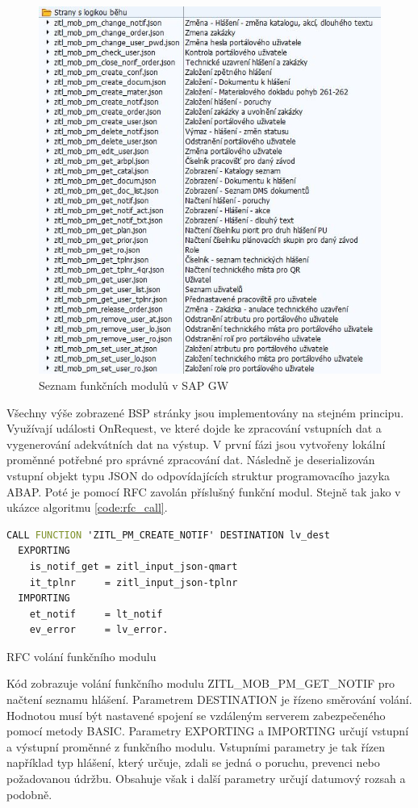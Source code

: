 \documentclass[thesis=M,czech]{FITthesis}[2012/06/26]
\begin{document}
\begin{figure}[H]
	\centering
	\includegraphics[width=1\textwidth]{images/gw_json}
	\caption{Seznam funkčních modulů v SAP GW}
	\label{img:gw_json}
\end{figure}

Všechny výše zobrazené BSP stránky jsou implementovány na stejném principu. Využívají události OnRequest, ve které dojde ke zpracování vstupních dat a vygenerování adekvátních dat na výstup. V první fázi jsou vytvořeny lokální proměnné potřebné pro správné zpracování dat. Následně je deserializován vstupní objekt typu JSON do odpovídajících struktur programovacího jazyka ABAP. Poté je pomocí RFC zavolán příslušný funkční modul. Stejně tak jako v ukázce algoritmu \ref{code:rfc_call}. 

\begin{algorithm}[H]	
	\begin{lstlisting}[language = VHDL]  
CALL FUNCTION 'ZITL_PM_CREATE_NOTIF' DESTINATION lv_dest
  EXPORTING
    is_notif_get = zitl_input_json-qmart
    it_tplnr     = zitl_input_json-tplnr
  IMPORTING
    et_notif     = lt_notif
    ev_error     = lv_error.
	\end{lstlisting}
	\caption{RFC volání funkčního modulu}	
	\label{code:rfc_call}
	\small Kód zobrazuje volání funkčního modulu ZITL\_MOB\_PM\_GET\_NOTIF pro načtení seznamu hlášení. Parametrem DESTINATION je řízeno směrování volání. Hodnotou musí být nastavené spojení se vzdáleným serverem zabezpečeného pomocí metody BASIC. Parametry EXPORTING a IMPORTING určují vstupní a výstupní proměnné z funkčního modulu. Vstupními parametry je tak řízen například typ hlášení, který určuje, zdali se jedná o poruchu, prevenci nebo požadovanou údržbu. Obsahuje však i další parametry určují datumový rozsah a podobně.
\end{algorithm}	
\end{document}
